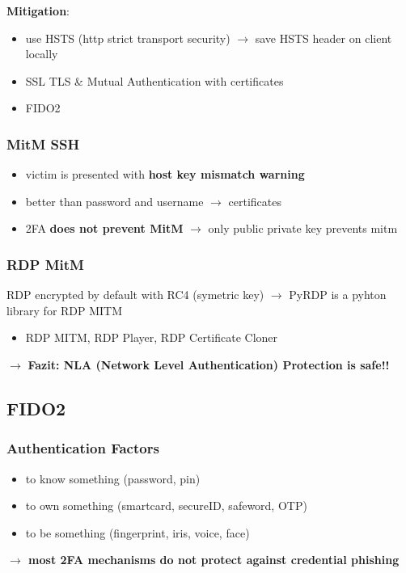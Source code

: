\textbf{Mitigation}:
\begin{itemize}
    \item use HSTS (http strict transport security) $\rightarrow$ save HSTS header on client locally
    \item SSL TLS \& Mutual Authentication with certificates
    \item FIDO2
\end{itemize}

\subsubsection{MitM SSH}
\begin{itemize}
    \item victim is presented with \textbf{host key mismatch warning}
    \item better than password and username $\rightarrow$ certificates
    \item 2FA \textbf{does not prevent MitM} $\rightarrow$ only public private key prevents mitm
\end{itemize}

\subsubsection{RDP MitM}
RDP encrypted by default with RC4 (symetric key) $\rightarrow$ PyRDP is a pyhton library for RDP MITM
\begin{itemize}
    \item RDP MITM, RDP Player, RDP Certificate Cloner
\end{itemize}
$\rightarrow$ \textbf{Fazit: NLA (Network Level Authentication) Protection is safe!!}

\subsection{FIDO2}
\subsubsection{Authentication Factors}
\begin{itemize}
    \item to know something (password, pin)
    \item to own something (smartcard, secureID, safeword, OTP)
    \item to be something (fingerprint, iris, voice, face)
\end{itemize}
\textbf{$\rightarrow$ most 2FA mechanisms do not protect against credential phishing}

